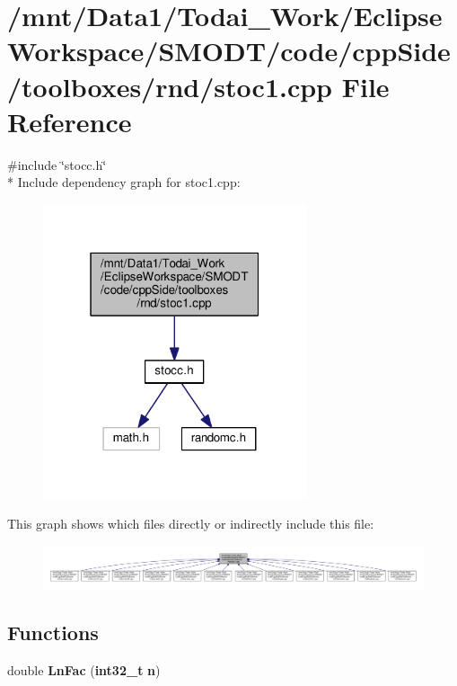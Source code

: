 \section{/mnt/\-Data1/\-Todai\-\_\-\-Work/\-Eclipse\-Workspace/\-S\-M\-O\-D\-T/code/cpp\-Side/toolboxes/rnd/stoc1.cpp File Reference}
\label{toolboxes_2rnd_2stoc1_8cpp}
{\ttfamily \#include \char`\"{}stocc.\-h\char`\"{}}\\*
Include dependency graph for stoc1.\-cpp\-:
\nopagebreak
\begin{figure}[H]
\begin{center}
\leavevmode
\includegraphics[width=220pt]{toolboxes_2rnd_2stoc1_8cpp__incl}
\end{center}
\end{figure}
This graph shows which files directly or indirectly include this file\-:
\nopagebreak
\begin{figure}[H]
\begin{center}
\leavevmode
\includegraphics[width=350pt]{toolboxes_2rnd_2stoc1_8cpp__dep__incl}
\end{center}
\end{figure}
\subsection*{Functions}
\begin{DoxyCompactItemize}
\item 
double {\bf Ln\-Fac} ({\bf int32\-\_\-t} {\bf n})
\end{DoxyCompactItemize}
